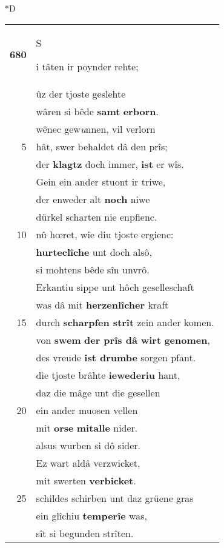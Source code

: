 \documentclass[8pt,a4paper,notitlepage]{article}
\begin{document}
\begin{table}[ht]
\begin{minipage}[t]{0.5\linewidth}
\small
\begin{center}*D
\end{center}
\begin{tabular}{rl}
\textbf{680} & \begin{large}S\end{large}i tâten ir poynder rehte;\\ 
 & ûz der tjoste geslehte\\ 
 & wâren si bêde \textbf{samt} \textbf{erborn}.\\ 
 & wênec gew\textit{u}nnen, vil verlorn\\ 
5 & hât, swer behaldet dâ den prîs;\\ 
 & der \textbf{klagt}\textbf{z} doch immer, \textbf{ist} er wîs.\\ 
 & Gein ein ander stuont ir triwe,\\ 
 & der enweder alt \textbf{noch} niwe\\ 
 & dürkel scharten nie enpfienc.\\ 
10 & nû hœret, wie diu tjoste ergienc:\\ 
 & \textbf{hurteclîche} unt doch alsô,\\ 
 & si mohtens bêde sîn unvrô.\\ 
 & Erkantiu sippe unt hôch geselleschaft\\ 
 & was dâ mit \textbf{herzenlîcher} kraft\\ 
15 & durch \textbf{scharpfen strît} zein ander komen.\\ 
 & von \textbf{swem} \textbf{der prîs dâ wirt} \textbf{genomen},\\ 
 & des vreude \textbf{ist drumbe} sorgen pfant.\\ 
 & die tjoste brâhte \textbf{iewederiu} hant,\\ 
 & daz die mâge unt die gesellen\\ 
20 & ein ander muosen vellen\\ 
 & mit \textbf{orse} \textbf{mitalle} nider.\\ 
 & alsus wurben si dô sider.\\ 
 & Ez wart aldâ verzwicket,\\ 
 & mit swerten \textbf{verbicket}.\\ 
25 & schildes schirben unt daz grüene gras\\ 
 & ein glîchiu \textbf{temperîe} was,\\ 
 & sît si begunden strîten.\\ 

\end{tabular}
\end{minipage}
\end{table}
\end{document}
